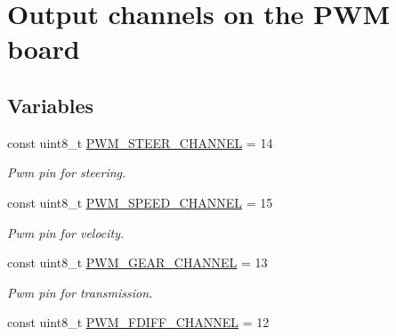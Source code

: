 \hypertarget{group__PwmOutputChannels}{}\section{Output channels on the P\+WM board}
\label{group__PwmOutputChannels}
\subsection*{Variables}
\begin{DoxyCompactItemize}
\item 
const uint8\+\_\+t \hyperlink{group__PwmOutputChannels_ga66104e4dc16a69aecae1e217ffb0c006}{P\+W\+M\+\_\+\+S\+T\+E\+E\+R\+\_\+\+C\+H\+A\+N\+N\+EL} = 14\hypertarget{group__PwmOutputChannels_ga66104e4dc16a69aecae1e217ffb0c006}{}\label{group__PwmOutputChannels_ga66104e4dc16a69aecae1e217ffb0c006}

\begin{DoxyCompactList}\small\item\em Pwm pin for steering. \end{DoxyCompactList}\item 
const uint8\+\_\+t \hyperlink{group__PwmOutputChannels_ga93d060ae523eab7a0c1c34b9ac646313}{P\+W\+M\+\_\+\+S\+P\+E\+E\+D\+\_\+\+C\+H\+A\+N\+N\+EL} = 15\hypertarget{group__PwmOutputChannels_ga93d060ae523eab7a0c1c34b9ac646313}{}\label{group__PwmOutputChannels_ga93d060ae523eab7a0c1c34b9ac646313}

\begin{DoxyCompactList}\small\item\em Pwm pin for velocity. \end{DoxyCompactList}\item 
const uint8\+\_\+t \hyperlink{group__PwmOutputChannels_gad993d35a100ed514d5de22d43c52bbf3}{P\+W\+M\+\_\+\+G\+E\+A\+R\+\_\+\+C\+H\+A\+N\+N\+EL} = 13\hypertarget{group__PwmOutputChannels_gad993d35a100ed514d5de22d43c52bbf3}{}\label{group__PwmOutputChannels_gad993d35a100ed514d5de22d43c52bbf3}

\begin{DoxyCompactList}\small\item\em Pwm pin for transmission. \end{DoxyCompactList}\item 
const uint8\+\_\+t \hyperlink{group__PwmOutputChannels_ga627cee35c7979d79719e12d6c22145e9}{P\+W\+M\+\_\+\+F\+D\+I\+F\+F\+\_\+\+C\+H\+A\+N\+N\+EL} = 12\hypertarget{group__PwmOutputChannels_ga627cee35c7979d79719e12d6c22145e9}{}\label{group__PwmOutputChannels_ga627cee35c7979d79719e12d6c22145e9}


\end{DoxyCompactItemize}
